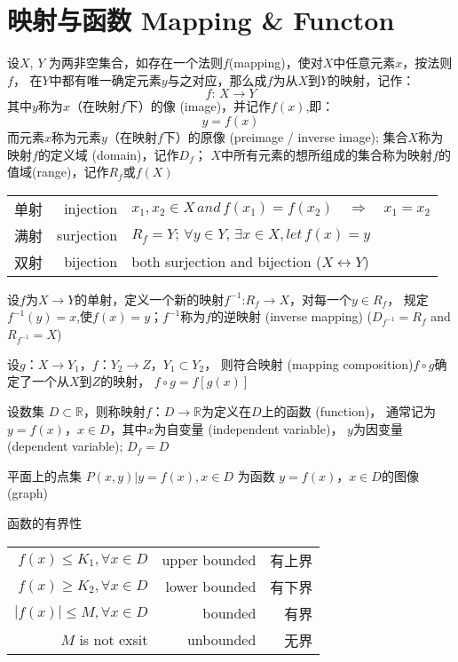 \documentclass[UTF8]{ctexart}
\begin{document}
\section*{映射与函数 Mapping \& Functon}

\bigskip

设$X$, $Y$ 为两非空集合，如存在一个法则$f$(mapping)，使对$X$中任意元素$x$，按法则$f$，
在$Y$中都有唯一确定元素$y$与之对应，那么成$f$为从$X$到$Y$的映射，记作：
\[
  f:\,X\to Y
\]
其中$y$称为$x$（在映射$f$下）的像 (image)，并记作$f(x)$,即：
\[
  y=f(x)
\]
而元素$x$称为元素$y$（在映射$f$下）的原像 (preimage / inverse image);
集合$X$称为映射$f$的定义域 (domain)，记作$D_f$；
$X$中所有元素的想所组成的集合称为映射$f$的值域(range)，记作$R_f$或$f(X)$

\bigskip
\bigskip

\begin{center}
  \begin{tabular}{crl}
  单射 & injection & $x_1,x_2\in X\,and\,f(x_1)=f(x_2)\quad\Rightarrow\quad x_1=x_2$\\
  满射 & surjection & $R_f=Y; \,\forall y\in Y,\,\exists x\in X, let\, f(x)=y$\\
  双射 & bijection & both surjection and bijection ($X\leftrightarrow Y$)
  \end{tabular}
\end{center}

\bigskip

设$f$为$X\to Y$的单射，定义一个新的映射$f^{-1}$:$R_f\to X$，对每一个$y\in R_f$，
规定$f^{-1}(y)=x$,使$f(x)=y$；$f^{-1}$称为$f$的逆映射 (inverse mapping)
 ($D_{f^{-1}}=R_f$ and $R_{f^{-1}}=X$)

\bigskip

设$g$：$X\to Y_1$，$f$：$Y_2\to Z$，$Y_1\subset Y_2$，
则符合映射 (mapping composition)$f\circ g$确定了一个从$X$到$Z$的映射，
$f\circ g=f[g(x)]$

\bigskip

设数集 $D\subset \mathbb{R}$，则称映射$f$：$D\to\mathbb{R}$为定义在$D$上的函数 (function)，
通常记为$y=f(x)$，$x\in D$，其中$x$为自变量 (independent variable)，
$y$为因变量 (dependent variable); $D_f=D$

\bigskip

平面上的点集 {$P(x,y)| y=f(x),x\in D$} 为函数 $y=f(x)$，$x\in D$的图像 (graph)

\bigskip

函数的有界性

\begin{center}
  \begin{tabular}{rrr}
    $f(x)\le K_1, \forall x \in D$ & upper bounded & 有上界\\
    $f(x)\ge K_2, \forall x \in D$ & lower bounded & 有下界\\
    $|f(x)|\le M, \forall x \in D$ & bounded & 有界\\
    $M$ is not exsit & unbounded & 无界
  \end{tabular}
\end{center}
\end{document}
